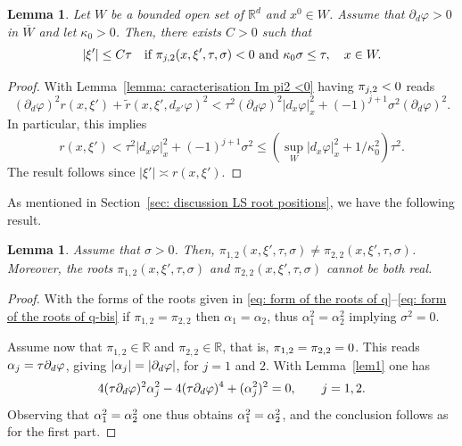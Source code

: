 \documentclass[JEP,XML,SOM,Unicode,published]{cedram}
\theoremstyle{plain}
\newtheorem{lemma}[theorem]{Lemma}
\theoremstyle{definition}
\def\R{\mathbb{R}}
\let\k\kappa
\let \Re \relax
\DeclareMathOperator{\Re}{Re}
\let \Im \relax
\DeclareMathOperator{\Im}{Im}
\newcommand{\ovl}[1]{\overline{#1}}
\begin{document}
\begin{lemma}
\label{lemma: low frequency caracterisation}
Let $W$ be a bounded open set of $\R^d$ and $x^0 \in W$. Assume that
$\partial_d \varphi>0$ in $\ovl{W}$ and let $\k_0>0$. Then, there exists $C>0$ such
that
\begin{equation*}
|\xi'| \leq C \tau \quad
\text{if} \ \Im \pi_{j,2} (x,\xi', \tau,\sigma) <0
\ \text{and}\ \k_0 \sigma \leq \tau, \quad x\in W.
\end{equation*}
\end{lemma}

\begin{proof}
With Lemma~\ref{lemma: caracterisation Im pi2 <0} having $\Im
\pi_{j,2} <0$ reads
\begin{equation*}
(\partial_d\varphi)^2r(x,\xi')+\tilde{r}(x,\xi',d_{x'}\varphi)^2
<\tau^2(\partial_d\varphi)^2|d_x\varphi|_x^2+(-1)^{j+1}\sigma^2(\partial_d\varphi)^2.
\end{equation*}
In particular,
this implies
\begin{equation*}
r(x,\xi') <\tau^2 |d_x\varphi|_x^2+(-1)^{j+1}\sigma^2
\leq (\sup_W |d_x\varphi|_x^2 + 1/\k_0^2) \tau^2.
\end{equation*}
The result follows since $|\xi'| \asymp r(x,\xi')$.
\end{proof}

As mentioned in Section~\ref{sec: discussion LS root positions}, we
have the following result.

\begin{lemma}
\label{lemma: no real double root}
Assume that $\sigma >0$. Then,
$\pi_{1,2} (x,\xi',\tau,\sigma)\neq \pi_{2,2} (x,\xi',\tau,\sigma)$. Moreover, the roots $\pi_{1,2} (x,\xi',\tau,\sigma) $ and $\pi_{2,2} (x,\xi',\tau,\sigma)$ cannot be both real.
\end{lemma}

\begin{proof}
With the forms of the roots given in \eqref{eq: form of the roots of q}--\eqref{eq: form of the
roots of q-bis} if $\pi_{1,2}=\pi_{2,2}$ then $\alpha_1 = \alpha_2$, thus
$\alpha_1^2 = \alpha_2^2$ implying $\sigma^2=0$.

Assume now that $\pi_{1,2} \in \R$ and $\pi_{2,2}\in \R$, that is,
$\Im \pi_{1,2} = \Im \pi_{2,2}=0$. This reads $\Re \alpha_j = \tau
\partial_d \varphi$, giving
$|\Re \alpha_j| = |\partial_d \varphi|$, for $j=1$ and $2$. With Lemma~\ref{lem1} one
has
\begin{equation*}
4 (\tau \partial_d\varphi)^2 \Re \alpha_j^2-4 (\tau \partial_d\varphi)^4+(\Im
\alpha_j^2)^2 =0,\qquad j=1,2.
\end{equation*}
Observing that $\Im \alpha_1^2 = \Im \alpha_2^2$ one thus obtains
$\Re \alpha_1^2 = \Re \alpha_2^2$,
and the conclusion follows as for the first part.
\end{proof}
\end{document}
